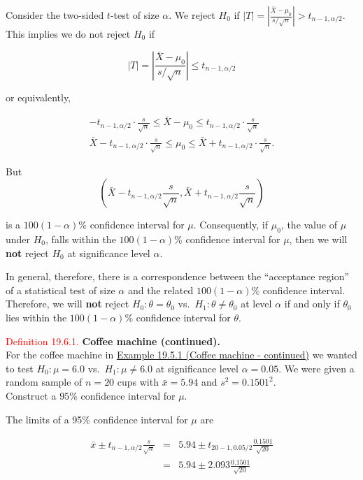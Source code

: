 \documentclass[
]{book}
\begin{document}
Consider the two-sided \(t\)-test of size \(\alpha\). We reject \(H_0\) if \(|T| = \left| \frac{\bar{X} - \mu_0}{s/\sqrt{n}} \right| > t_{n-1,\alpha/2}\). This implies we do not reject \(H_0\) if

\[
|T| = \left| \frac{\bar{X} - \mu_0}{s/\sqrt{n}} \right| \leq t_{n-1,\alpha/2} 
\]

or equivalently,

\begin{eqnarray*}
&-t_{n-1,\alpha/2} \cdot \frac{s}{\sqrt{n}} \leq \bar{X} - \mu_0 \leq t_{n-1,\alpha/2} \cdot \frac{s}{\sqrt{n}}& \\
& \bar{X}-t_{n-1,\alpha/2} \cdot \frac{s}{\sqrt{n}} \leq \mu_0 \leq \bar{X} + t_{n-1,\alpha/2} \cdot \frac{s}{\sqrt{n}}. &
\end{eqnarray*}

But\\

\[\left( \bar{X}-t_{n-1,\alpha/2} \frac{s}{\sqrt{n}} , \bar{X}+t_{n-1,\alpha/2} \frac{s}{\sqrt{n}} \right)\]

is a \(100(1-\alpha)\%\) confidence interval for \(\mu\). Consequently, if \(\mu_0\), the value of \(\mu\) under \(H_0\), falls within the \(100(1-\alpha)\%\) confidence interval for \(\mu\), then we will \textbf{not} reject \(H_0\) at significance level \(\alpha\).

In general, therefore, there is a correspondence between the ``acceptance region'' of a statistical test of size \(\alpha\) and the related \(100(1-\alpha)\%\) confidence interval. Therefore, we will \textbf{not} reject \(H_0 : \theta = \theta_0\) vs.~\(H_1: \theta \neq \theta_0\) at level \(\alpha\) if and only if \(\theta_0\) lies within the \(100(1-\alpha)\%\) confidence interval for \(\theta\).

\leavevmode{}%
\textcolor{red}{Definition 19.6.1.}
{\textbf{Coffee machine (continued).}}\\
For the coffee machine in \protect\hyperlink{Sec_Hypo_Test:ex:coffee_machineIII}{Example 19.5.1 (Coffee machine - continued)} we wanted to test \(H_0 : \mu = 6.0\) vs.~\(H_1: \mu \neq 6.0\) at significance level \(\alpha = 0.05\). We were given a random sample of \(n=20\) cups with \(\bar{x} = 5.94\) and \(s^2 = 0.1501^2\).\\
Construct a \(95\%\) confidence interval for \(\mu\).

The limits of a 95\% confidence interval for \(\mu\) are

\begin{eqnarray*}
\bar{x} \pm t_{n-1,\alpha/2} \frac{s}{\sqrt{n}} &=& 5.94 \pm t_{20-1,0.05/2}\frac{0.1501}{\sqrt{20}} \\
&=& 5.94 \pm 2.093 \frac{0.1501}{\sqrt{20}}
\end{eqnarray*}
\end{document}
